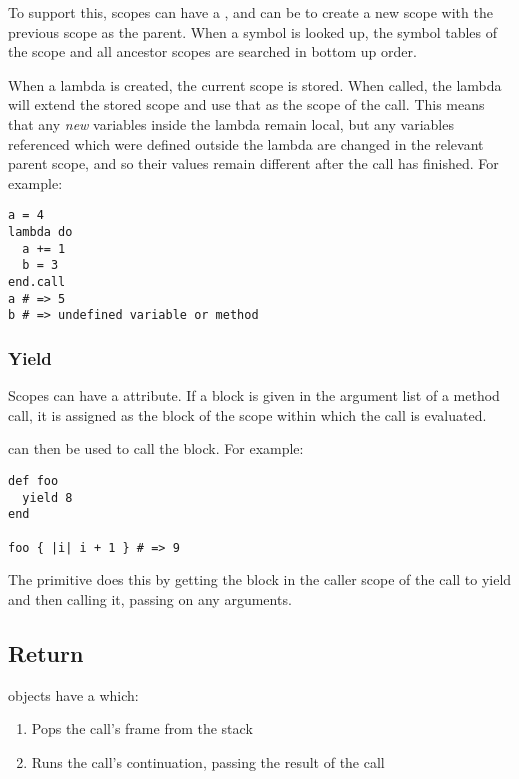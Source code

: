 To support this, scopes can have a , and can be  to create a new scope with the previous scope as the parent. When a symbol is looked up, the symbol tables of the scope and all ancestor scopes are searched in bottom up order.

When a lambda is created, the current scope is stored. When called, the lambda will extend the stored scope and use that as the scope of the call. This means that any \textit{new} variables inside the lambda remain local, but any variables referenced which were defined outside the lambda are changed in the relevant parent scope, and so their values remain different after the call has finished. For example:

\begin{lstlisting}
a = 4
lambda do
  a += 1
  b = 3
end.call
a # => 5
b # => undefined variable or method
\end{lstlisting}

\subsubsection{Yield}

Scopes can have a  attribute. If a block is given in the argument list of a method call, it is assigned as the block of the scope within which the call is evaluated.

 can then be used to call the block. For example:

\begin{lstlisting}
def foo
  yield 8
end

foo { |i| i + 1 } # => 9
\end{lstlisting}

The  primitive does this by getting the block in the caller scope of the call to yield and then calling it, passing on any arguments.

\subsection{Return}

 objects have a  which:

\begin{enumerate}
  \item Pops the call's frame from the stack
  \item Runs the call's continuation, passing the result of the call
\end{enumerate}


